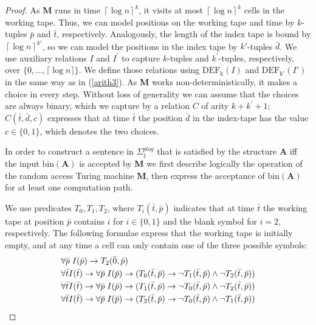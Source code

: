 \documentclass{article}
\begin{document}
\begin{proof}
As \textbf{M} runs in time $\left\lceil \log n\right\rceil^k$, it visits at most $\left\lceil \log n\right\rceil^k$ cells in the working tape. Thus, we can model positions on the working tape and time by $k$-tuples $\bar{p}$ and $\bar{t}$, respectively. Analogously, the length of the index tape is bound by $\left\lceil \log n\right\rceil^{k'} $, so we can model the positions in the index tape by $k'$-tuples $\bar{d}$. We use auxiliary relations $I$ and $I^\prime$ to capture $k$-tuples and $k^\prime$-tuples, respectively, over $\{ 0 ,\dots, \lceil \log n \rceil \}$.  We define those relations using $\mathrm{DEF_k}(I)$ and $\mathrm{DEF_{k'}}(I')$ in the same way as in (\ref{arith3}).
As \textbf{M} works non-deterministically, it makes a choice in every step. Without loss of generality we can assume that the choices are always binary, which we capture by a relation $C$ of arity $k + k^\prime + 1$; $C(\bar{t},\bar{d},c)$ expresses that at time $\bar{t}$ the position $\bar{d}$ in the index-tape has the value $c \in \{0,1\}$, which denotes the two choices.

In order to construct a sentence in $\Sigma^{\mathit{plog}}_1$ that is satisfied by the structure \textbf{A} iff the input $\mathrm{bin}(\textbf{A})$ is accepted by \textbf{M} we first describe logically the operation of the random access Turing machine \textbf{M}, then express the acceptance of $\mathrm{bin}(\textbf{A})$ for at least one computation path.

We use predicates $T_0, T_1, T_2$, where $T_i(\bar{t},\bar{p})$ indicates that at time $\bar{t}$ the working tape at position $\bar{p}$ contains $i$ for $i \in \{ 0,1 \}$ and the blank symbol for $i=2$, respectively. The following formulae express that the working tape is initially empty, and at any time a cell can only contain one of the three possible symbols:
\begin{align}
& \forall \bar{p} \; I(\bar{p}) \rightarrow T_2(\bar{0},\bar{p}) \notag \\
& \forall \bar{t} I(\bar{t}) \rightarrow \forall \bar{p} \; I(\bar{p}) \rightarrow ( T_0(\bar{t},\bar{p}) \rightarrow \neg T_1(\bar{t},\bar{p}) \wedge \neg T_2(\bar{t},\bar{p}) ) \notag \\
& \forall \bar{t} I(\bar{t}) \rightarrow \forall \bar{p} \; I(\bar{p}) \rightarrow ( T_1(\bar{t},\bar{p}) \rightarrow \neg T_0(\bar{t},\bar{p}) \wedge \neg T_2(\bar{t},\bar{p}) ) \notag \\
& \forall \bar{t} I(\bar{t}) \rightarrow \forall \bar{p} \; I(\bar{p}) \rightarrow ( T_2(\bar{t},\bar{p}) \rightarrow \neg T_0(\bar{t},\bar{p}) \wedge \neg T_1(\bar{t},\bar{p}) ) \label{eq-2}
\end{align}


\end{proof}
\end{document}
